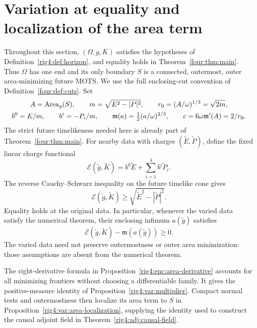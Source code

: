\section{Variation at equality and localization of the area term}
\label{rig4:var:section}

Throughout this section, $(\Omega,g,K)$ satisfies the hypotheses of
Definition~\ref{rig4:def:horizon}, and equality holds in
Theorem~\ref{four:thm:main}. Thus $\Omega$ has one end and its only boundary
$S$ is a connected, outermost, outer area-minimizing future MOTS. We use the
full enclosing-cut convention of Definition~\ref{four:def:cuts}. Set
\begin{equation}
\begin{gathered}
 A=\operatorname{Area}_g(S),\qquad m=\sqrt{E^2-|P|^2},\qquad
 r_0=(A/\omega)^{1/3}=\sqrt{2m},\\
 b^0=E/m,\qquad b^i=-P_i/m,\qquad
 \mathfrak m(a)=\tfrac12(a/\omega)^{2/3},\qquad
 c=6\omega\mathfrak m'(A)=2/r_0.
\end{gathered}
\label{rig4:var:constants}
\end{equation}
The strict future timelikeness needed here is already part of
Theorem~\ref{four:thm:main}. For nearby data with charges
$(\widetilde E,\widetilde P)$, define the fixed linear charge functional
\[
 \mathcal E(\widetilde g,\widetilde K)
   =b^0\widetilde E+\sum_{i=1}^4b^i\widetilde P_i.
\]
The reverse Cauchy--Schwarz inequality on the future timelike cone gives
\begin{equation}
 \mathcal E(\widetilde g,\widetilde K)
 \ge \sqrt{\widetilde E^2-|\widetilde P|^2}.
\label{rig4:var:supporting-charge}
\end{equation}
Equality holds at the original data. In particular, whenever the varied
data satisfy the numerical theorem, their enclosing infimum
$a(\widetilde g)$ satisfies
\begin{equation}
 \mathcal E(\widetilde g,\widetilde K)
       -\mathfrak m(a(\widetilde g))\ge0.
\label{rig4:var:nonnegative-defect}
\end{equation}
The varied data need not preserve outermostness or outer area minimization:
those assumptions are absent from the numerical theorem.

The right-derivative formula in
Proposition~\ref{rig4:enc:area-derivative} accounts for all minimizing
frontiers without choosing a differentiable family. It gives the
positive-measure identity of Proposition~\ref{rig4:var:multiplier}.
Compact normal tests and outermostness then localize its area term to $S$
in Proposition~\ref{rig4:var:area-localization}, supplying the identity used
to construct the causal adjoint field in Theorem~\ref{rig4:adj:causal-field}.

